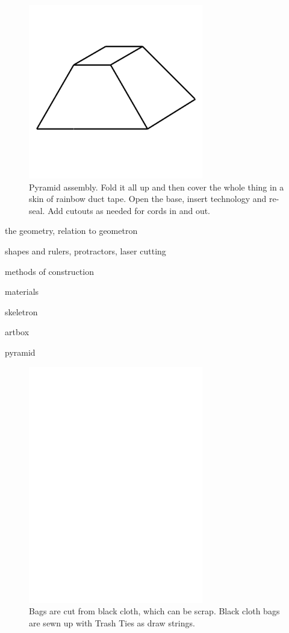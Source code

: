 \begin{figure}
	\centering
	\includegraphics[width=3in]{figures/actiongeometry/pyramid.png}
	\caption[pyramid]
	{Pyramid assembly.  Fold it all up and then cover the whole thing in a skin of rainbow duct tape.  Open the base, insert technology and re-seal.  Add cutouts as needed for cords in and out.}
\end{figure}

the geometry, relation to geometron

shapes and rulers, protractors, laser cutting

methods of construction

materials

skeletron

artbox

pyramid

\begin{figure}
	\centering
	\includegraphics[width=3in]{figures/shapes/blank.png}
    \caption[bags]
	{Bags are cut from black cloth, which can be scrap.  Black cloth bags are sewn up with Trash Ties as draw strings.}
\end{figure}


